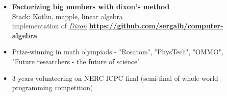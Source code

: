 \documentclass[10pt, a4paper]{report}
\begin{document}
\begin{itemize}
        \item \textbf{Factorizing big numbers with dixon's method}\\
        Stack: Kotlin, mapple, linear algebra\\
        implementation of \href{https://en.wikipedia.org/wiki/Dixon\%27s_factorization_method}{\textit{Dixon}}
        \textbf{
        \url{https://github.com/sergalb/computer-algebra}
        }

        \item Prize-winning in math olympiads - "Rosatom", "PhysTech", "OMMO", "Future researchers - the future of science"
        \item 3 years volunteering on NERC ICPC final (semi-final of whole world programming competition)
    \end{itemize}
\end{document}
